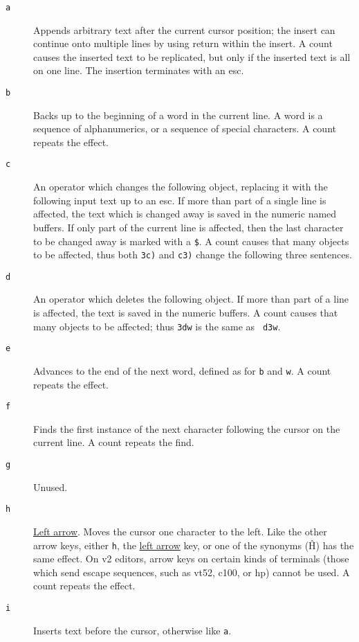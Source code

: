 \begin{description}
\item[{\tt a}] Appends arbitrary text after the current cursor position; the
insert can continue onto multiple lines by using {\sc return} within the
insert. A count causes the inserted text to be replicated, but only if the
inserted text is all on one line. The insertion terminates with an {\sc esc}.

\item[{\tt b}] Backs up to the beginning of a word in the current line. A word
is a sequence of alphanumerics, or a sequence of special characters. A count
repeats the effect.

\item[{\tt c}] An operator which changes the following object, replacing it
with the following input text up to an {\sc esc}. If more than part of a
single line is affected, the text which is changed away is saved in the
numeric named buffers. If only part of the current line is affected, then the
last character to be changed away is marked with a {\tt \$}. A count causes
that many objects to be affected, thus both {\tt 3c)} and {\tt c3)} change the
following three sentences.

\item[{\tt d}] An operator which deletes the following object. If more than
part of a line is affected, the text is saved in the numeric buffers. A count
causes that many objects to be affected; thus {\tt 3dw} is the same as {\tt
d3w}.

\item[{\tt e}] Advances to the end of the next word, defined as for {\tt b}
and {\tt w}. A count repeats the effect.

\item[{\tt f}] Finds the first instance of the next character following the
cursor on the current line.  A count repeats the find.

\item[{\tt g}] Unused.

\item[{\tt h}] \ul{Left arrow}. Moves the cursor one character to the left.
Like the other arrow keys, either {\tt h}, the \ul{left arrow} key, or one of
the synonyms (\^{H}) has the same effect. On v2 editors, arrow keys on certain
kinds of terminals (those which send escape sequences, such as vt52, c100, or
hp) cannot be used. A count repeats the effect.

\item[{\tt i}] Inserts text before the cursor, otherwise like {\tt a}.


\end{description}
